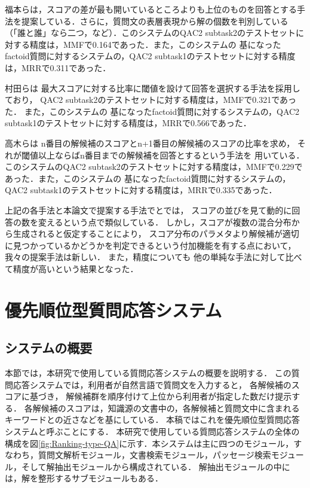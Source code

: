 \documentclass[japanese]{jnlp_1.4}
\begin{document}
福本ら\cite{Fukumoto:Rits-QA}は，スコアの差が最も開いているところよりも上位のものを回答とする手法を提案している．さらに，質問文の表層表現から解の個数を判別している（「誰と誰」なら二つ，など）．このシステムのQAC2 subtask2のテストセットに対する精度は，MMFで0.164であった．また，このシステムの
基になったfactoid質問に対するシステムの，QAC2 subtask1のテストセットに対する精度は，MRRで0.311であった．

村田ら\cite{Murata:JapaneseQAsystemUsingDecreasedAddingwithMultipleAnswers}は
最大スコアに対する比率に閾値を設けて回答を選択する手法を採用しており，
QAC2 subtask2のテストセットに対する精度は，MMFで0.321であった．
また，このシステムの
基になったfactoid質問に対するシステムの，QAC2 subtask1のテストセットに対する精度は，MRRで0.566であった．

高木ら\cite{Takaki:NTTDATA-QAatNTCIRQAC2}は
n番目の解候補のスコアとn+1番目の解候補のスコアの比率を求め，
それが閾値以上ならばn番目までの解候補を回答とするという手法を
用いている．このシステムのQAC2 subtask2のテストセットに対する精度は，MMFで0.229であった．また，このシステムの
基になったfactoid質問に対するシステムの，QAC2 subtask1のテストセットに対する精度は，MRRで0.335であった．

上記の各手法と本論文で提案する手法でとでは，
スコアの並びを見て動的に回答の数を変えるという点で類似している．
しかし，スコアが複数の混合分布から生成されると仮定することにより，
スコア分布のパラメタより解候補が適切に見つかっているかどうかを判定できるという付加機能を有する点において，我々の提案手法は新しい．
また，精度についても
他の単純な手法に対して比べて精度が高いという結果となった．



\section{優先順位型質問応答システム}

\subsection{システムの概要}

本節では，本研究で使用している質問応答システム\cite{Mori:NTCIR4WN:JapaneseQASystemUsingA*SearchAndItsImprovement}の概要を説明する．
この質問応答システムでは，利用者が自然言語で質問文を入力すると，
各解候補のスコアに基づき，
解候補群を順序付けて上位から利用者が指定した数だけ提示する．
各解候補のスコアは，知識源の文書中の，各解候補と質問文中に含まれるキーワードとの近さなどを基にしている．
本稿ではこれを優先順位型質問応答システムと呼ぶことにする．
本研究で使用している質問応答システムの全体の構成を図\ref{fig:Ranking-type-QA}に示す．本システムは主に四つのモジュール，すなわち，質問文解析モジュール，文書検索モジュール，パッセージ検索モジュール，そして解抽出モジュールから構成されている．
解抽出モジュールの中には，解を整形するサブモジュールもある．
\end{document}

